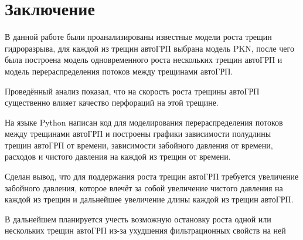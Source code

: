 \chapter*{Заключение} \label{ch-conclusion}

В данной работе были проанализированы известные модели роста трещин гидроразрыва, для каждой из трещин автоГРП выбрана модель PKN, после чего была построена модель одновременного роста нескольких трещин автоГРП и модель перераспределения потоков между трещинами автоГРП.

Проведённый анализ показал, что на скорость роста трещины автоГРП существенно влияет качество перфораций на этой трещине.

На языке Python написан код для моделирования перераспределения потоков между трещинами автоГРП и построены графики зависимости полудлины трещин автоГРП от времени, зависимости забойного давления от времени, расходов и чистого давления на каждой из трещин от времени.

Сделан вывод, что для поддержания роста трещин автоГРП требуется увеличение забойного давления, которое влечёт за собой увеличение чистого давления на каждой из трещин и дальнейшее увеличение длины каждой из трещин автоГРП.

В дальнейшем планируется учесть возможную остановку роста одной или нескольких трещин автоГРП из-за ухудшения фильтрационных свойств на ней 